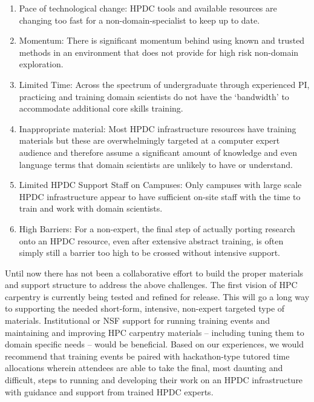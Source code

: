 \documentclass[10pt,letterpaper,draft]{article}
\begin{document}
\begin{enumerate}
    \item Pace of technological change: HPDC tools and available resources are changing too fast for a non-domain-specialist to keep up to date.
    \item Momentum:  There is significant momentum behind using known and trusted methods in an environment that does not provide for high risk non-domain exploration.
    \item Limited Time:  Across the spectrum of undergraduate through experienced PI, practicing and training domain scientists do not have the ‘bandwidth’ to accommodate additional core skills training.
    \item Inappropriate material: Most HPDC infrastructure resources have training materials but these are overwhelmingly targeted at a computer expert audience and therefore assume a significant amount of knowledge and even language terms that domain scientists are unlikely to have or understand.
    \item Limited HPDC Support Staff on Campuses: Only campuses with large scale HPDC infrastructure appear to have sufficient on-site staff with the time to train and work with domain scientists. 
    \item High Barriers: For a non-expert, the final step of actually porting research onto an HPDC resource, even after extensive abstract training, is often simply still a barrier too high to be crossed without intensive support.

\end{enumerate}
Until now there has not been a collaborative effort to build the proper materials and support structure to address the above challenges. The first vision of HPC carpentry is currently being tested and refined for release. This will go a long way to supporting the needed short-form, intensive, non-expert targeted type of materials. Institutional or NSF support for running training events and maintaining and improving HPC carpentry materials -- including tuning them to domain specific needs -- would be beneficial. Based on our experiences, we would recommend that training events be paired with hackathon-type tutored time allocations wherein attendees are able to take the final, most daunting and difficult, steps to running and developing their work on an HPDC infrastructure with guidance and support from trained HPDC experts.
\end{document}
